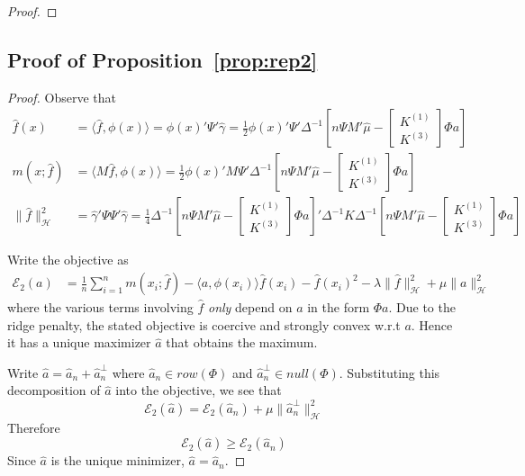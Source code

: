 \begin{proof}
\end{proof}

\subsection{Proof of Proposition~\ref{prop:rep2}}

\begin{proof}
Observe that
\begin{align}
    \hat{f}(x)&=\langle \hat{f} ,\phi(x) \rangle=\phi(x)'\Psi' \hat{\gamma}=\frac{1}{2}\phi(x)'\Psi'\Delta^{-1}\left[n\Psi M' \hat{\mu} -\begin{bmatrix}K^{(1)} \\ K^{(3)} \end{bmatrix}\Phi a\right] \\
    m(x;\hat{f})&=\langle M\hat{f},\phi(x) \rangle =\frac{1}{2} \phi(x)'M\Psi' \Delta^{-1}\left[n\Psi M' \hat{\mu} -\begin{bmatrix}K^{(1)} \\ K^{(3)} \end{bmatrix}\Phi a\right] \\
   \|\hat{f}\|_{\mathcal{H}}^2 &=\hat{\gamma}'\Psi \Psi'\hat{\gamma}
   = \frac{1}{4}  \Delta^{-1}\left[n\Psi M' \hat{\mu} -\begin{bmatrix}K^{(1)} \\ K^{(3)} \end{bmatrix}\Phi a\right]'
   \Delta^{-1}
   K  
   \Delta^{-1}\left[n\Psi M' \hat{\mu} -\begin{bmatrix}K^{(1)} \\ K^{(3)} \end{bmatrix}\Phi a\right]
\end{align}

Write the objective as 
\begin{align}
    \mathcal{E}_{2}(a)&=\frac{1}{n}\sum_{i=1}^n m(x_i;\hat{f})-\langle a,\phi(x_i)\rangle \hat{f}(x_i)- \hat{f}(x_i)^2-\lambda\|\hat{f}\|^2_{\mathcal{H}}+\mu\|a\|^2_{\mathcal{H}}
\end{align}
where the various terms involving $\hat{f}$ \textit{only} depend on $a$ in the form $\Phi a$. Due to the ridge penalty, the stated objective is coercive and strongly convex w.r.t $a$. Hence it has a unique maximizer $\hat{a}$ that obtains the maximum.

Write $\hat{a}=\hat{a}_n+\hat{a}^{\perp}_n$ where $\hat{a}_n\in row(\Phi)$ and $\hat{a}_n^{\perp}\in null(\Phi)$. Substituting this decomposition of $\hat{a}$ into the objective, we see that
$$
\mathcal{E}_{2}(\hat{a})=\mathcal{E}_{2}(\hat{a}_n)+\mu \|\hat{a}_n^{\perp}\|^2_{\mathcal{H}}
$$
Therefore
$$
\mathcal{E}_{2}(\hat{a})\geq \mathcal{E}_{2}(\hat{a}_n)
$$
Since $\hat{a}$ is the unique minimizer, $\hat{a}=\hat{a}_n$.
\end{proof}

